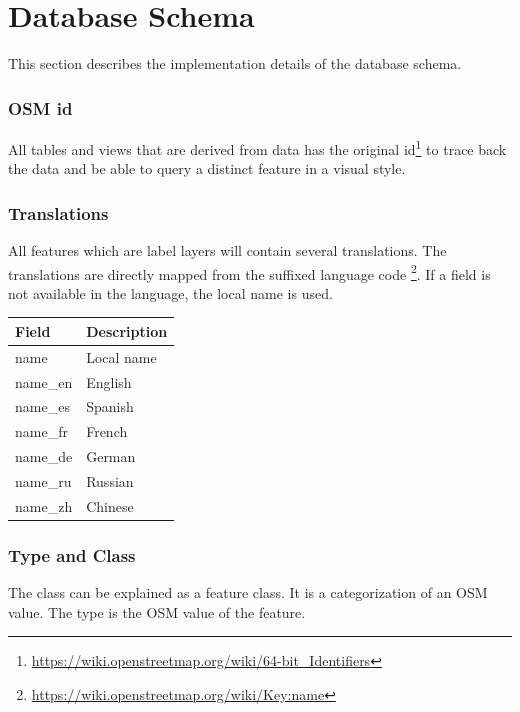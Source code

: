 \section{Database Schema}

This section describes the implementation details of the database schema.

\subsubsection{OSM id}
All tables and views that are derived from \osm{} data has the original id\footnote{\url{https://wiki.openstreetmap.org/wiki/64-bit_Identifiers}}
to trace back the data and be able to query a distinct \osm{} feature in a visual style.

\subsubsection{Translations}
All features which are label layers will contain several translations.
The translations are directly mapped from the suffixed language code \footnote{\url{https://wiki.openstreetmap.org/wiki/Key:name}}. If a field is not available in the language, the local name is used.

\begin{flushleft}
    \begin{tabular}{ll}
    \hline
     Field    & 	Description                                    \\
    \hline
    name      & Local name  \\
    name\_en	 & English                          \\
    name\_es	 & Spanish                          \\
    name\_fr	 & French                           \\
    name\_de	 & German                           \\
    name\_ru	 & Russian                          \\
    name\_zh	 & Chinese                          \\
    \end{tabular}
\end{flushleft}

\subsubsection{Type and Class}
The class can be explained as a feature class. It is a categorization of an OSM value.
The type is the OSM value of the feature.

